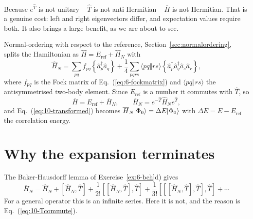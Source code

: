 Because $e^{\hat{T}}$ is not unitary -- $\hat{T}$ is not anti-Hermitian --
$\overline{H}$ is not Hermitian.  That is a genuine cost: left and right
eigenvectors differ, and expectation values require both.  It also brings a
large benefit, as we are about to see.

Normal-ordering with respect to the reference, Section~\ref{sec:normalordering},
splits the Hamiltonian as $\hat{H}=E_{\mathrm{ref}}+\hat{H}_N$ with
\begin{equation}
  \hat{H}_N = \sum_{pq}f_{pq}\left\{\hat{a}^{\dagger}_p\hat{a}_q\right\}
    + \frac{1}{4}\sum_{pqrs}\langle pq\Vert rs\rangle
      \left\{\hat{a}^{\dagger}_p\hat{a}^{\dagger}_q
        \hat{a}_s\hat{a}_r\right\},
  \label{eq:10-HN}
\end{equation}
where $f_{pq}$ is the Fock matrix of Eq.~(\ref{eq:6-fockmatrix}) and
$\langle pq\Vert rs\rangle$ the antisymmetrised two-body element.  Since
$E_{\mathrm{ref}}$ is a number it commutes with $\hat{T}$, so
\begin{equation}
  \overline{H} = E_{\mathrm{ref}} + \overline{H}_N,
  \qquad
  \overline{H}_N = e^{-\hat{T}}\hat{H}_Ne^{\hat{T}},
  \label{eq:10-HbarN}
\end{equation}
and Eq.~(\ref{eq:10-transformed}) becomes
$\overline{H}_N\vert \Phi_0 \rangle=\Delta E\vert \Phi_0 \rangle$ with
$\Delta E=E-E_{\mathrm{ref}}$ the correlation energy.

\section{Why the expansion terminates}
\label{sec:termination}

The Baker-Hausdorff lemma of Exercise~\ref{ex:6-bch}d) gives
\begin{equation}
  \overline{H}_N = \hat{H}_N + \left[\hat{H}_N,\hat{T}\right]
    + \frac{1}{2!}\left[\left[\hat{H}_N,\hat{T}\right],\hat{T}\right]
    + \frac{1}{3!}\left[\left[\left[\hat{H}_N,\hat{T}\right],
      \hat{T}\right],\hat{T}\right] + \cdots
  \label{eq:10-bch}
\end{equation}
For a general operator this is an infinite series.  Here it is not, and the
reason is Eq.~(\ref{eq:10-Tcommute}).

